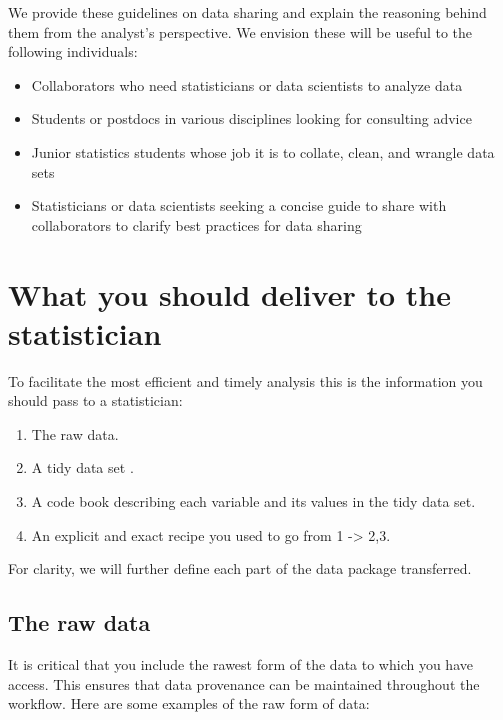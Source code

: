 \documentclass[12pt]{article}
\providecommand{\tightlist}{%
  \setlength{\itemsep}{0pt}\setlength{\parskip}{0pt}}
\begin{document}
We provide these guidelines on data sharing and explain the reasoning
behind them from the analyst's perspective. We envision these will be
useful to the following individuals:

\begin{itemize}
\tightlist
\item
  Collaborators who need statisticians or data scientists to analyze
  data
\item
  Students or postdocs in various disciplines looking for consulting
  advice
\item
  Junior statistics students whose job it is to collate, clean, and
  wrangle data sets
\item
  Statisticians or data scientists seeking a concise guide to share with
  collaborators to clarify best practices for data sharing
\end{itemize}

\section{What you should deliver to the
statistician}\label{what-you-should-deliver-to-the-statistician}

To facilitate the most efficient and timely analysis this is the
information you should pass to a statistician:

\begin{enumerate}
\def\labelenumi{\arabic{enumi}.}
\tightlist
\item
  The raw data.
\item
  A tidy data set \citep{_tidy_data}.
\item
  A code book describing each variable and its values in the tidy data
  set.
\item
  An explicit and exact recipe you used to go from 1 -\textgreater{}
  2,3.
\end{enumerate}

For clarity, we will further define each part of the data package
transferred.

\subsection{The raw data}\label{the-raw-data}

It is critical that you include the rawest form of the data to which you
have access. This ensures that data provenance can be maintained
throughout the workflow. Here are some examples of the raw form of data:
\end{document}
